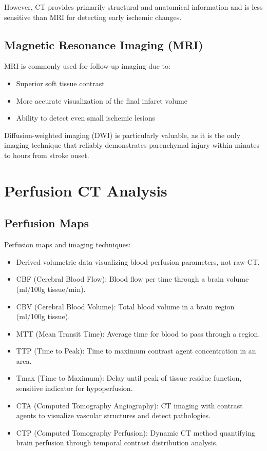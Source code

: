 However, CT provides primarily structural and anatomical information and is less sensitive than MRI for detecting early ischemic changes.

\subsection{Magnetic Resonance Imaging (MRI)}

MRI is commonly used for follow-up imaging due to:

\begin{itemize}
    \item Superior soft tissue contrast
    \item More accurate visualization of the final infarct volume
    \item Ability to detect even small ischemic lesions
\end{itemize}

Diffusion-weighted imaging (DWI) is particularly valuable, as it is the only imaging technique that reliably demonstrates parenchymal injury within minutes to hours from stroke onset.

\section{Perfusion CT Analysis}

\subsection{Perfusion Maps}

Perfusion maps and imaging techniques:
\begin{itemize}
  \item Derived volumetric data visualizing blood perfusion parameters, not raw CT.
  \item CBF (Cerebral Blood Flow): Blood flow per time through a brain volume (ml/100g tissue/min).
  \item CBV (Cerebral Blood Volume): Total blood volume in a brain region (ml/100g tissue).
  \item MTT (Mean Transit Time): Average time for blood to pass through a region.
  \item TTP (Time to Peak): Time to maximum contrast agent concentration in an area.
  \item Tmax (Time to Maximum): Delay until peak of tissue residue function, sensitive indicator for hypoperfusion.
  \item CTA (Computed Tomography Angiography): CT imaging with contrast agents to visualize vascular structures and detect pathologies.
  \item CTP (Computed Tomography Perfusion): Dynamic CT method quantifying brain perfusion through temporal contrast distribution analysis.
\end{itemize}

